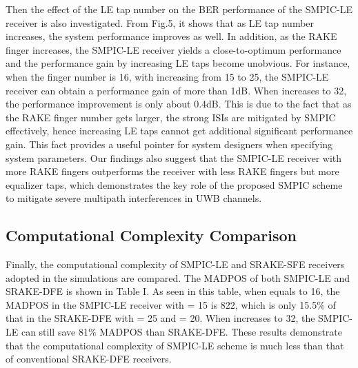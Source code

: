 \documentclass[journal]{IEEEtran}
\begin{document}
Then the effect of the LE tap number on the BER performance of the
SMPIC-LE receiver is also investigated. From Fig.5, it shows that as
LE tap number  increases, the system performance improves as
well. In addition, as the RAKE finger  increases, the SMPIC-LE
receiver yields a close-to-optimum performance and the performance
gain by increasing LE taps become unobvious. For instance, when the
finger number  is 16, with  increasing from 15 to 25, the
SMPIC-LE receiver can obtain a performance gain of more than 1dB.
When  increases to 32, the performance improvement is only about
0.4dB. This is due to the fact that as the RAKE finger number gets
larger, the strong ISIs are mitigated by SMPIC effectively, hence
increasing LE taps cannot get additional significant performance
gain. This fact provides a useful pointer for system designers when
specifying system parameters. Our findings also suggest that the
SMPIC-LE receiver with more RAKE fingers outperforms the receiver
with less RAKE fingers but more equalizer taps, which demonstrates
the key role of the proposed SMPIC scheme to mitigate severe
multipath interferences in UWB channels.

\subsection{Computational Complexity Comparison}
Finally, the computational complexity of SMPIC-LE and SRAKE-SFE
receivers adopted in the simulations are compared. The MADPOS of
both SMPIC-LE and SRAKE-DFE is shown in Table I. As seen in this
table, when  equals to 16, the MADPOS in the SMPIC-LE receiver
with  = 15 is 822, which is only 15.5\% of that in the SRAKE-DFE
with  = 25 and  = 20. When  increases to 32, the SMPIC-LE
can still save 81\% MADPOS than SRAKE-DFE. These results demonstrate
that the computational complexity of SMPIC-LE scheme is much less
than that of conventional SRAKE-DFE receivers.

\newcommand{\tabincell}[2]{\begin{tabular}{@{}#1@{}}#2\end{tabular}}
\begin{table}[!t]
\caption{Computational Complexity Comparison (MADPOS)}
\label{compare} \centering
\begin{tabular}{ccccc}
\hline
&             &  \tabincell{c}{SRAKE-DFE \LpJJ$ = 32 &5329 &1014 &81.0\% \\
\hline
\end{tabular}
\end{table}
\end{document}
